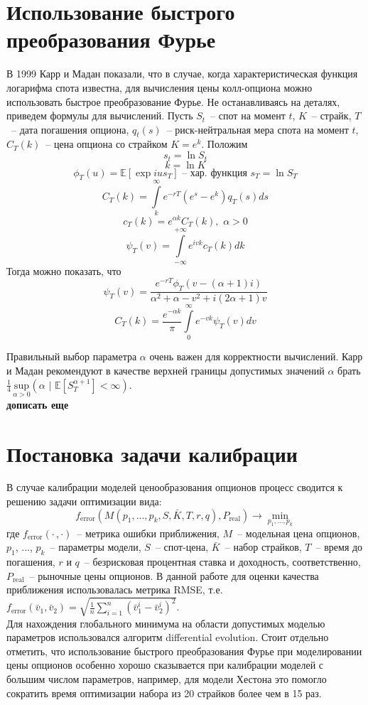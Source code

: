 \documentclass[oneside, final, 12pt]{article}
\begin{document}
\section{Использование быстрого преобразования Фурье}
В 1999 Карр и Мадан показали, что в случае, когда характеристическая функция логарифма спота известна, для вычисления цены колл-опциона можно использовать быстрое преобразование Фурье. Не останавливаясь на деталях, приведем формулы для вычислений. Пусть $S_t$~-- спот на момент $t$, $K$~-- страйк, $T$~-- дата погашения опциона, $q_t(s)$~-- риск-нейтральная мера спота на момент $t$, $C_T(k)$~-- цена опциона со страйком $K = e^k$. Положим
\[ s_t = \ln{S_t} \]
\[ k = \ln{K} \]
\[ \phi_T(u) = \mathbb{E}\left[ \exp{ius_T} \right] \text{~-- хар. функция } s_T=\ln{S_T}\]
\[ C_T(k) = \int\limits_k^\infty e^{-rT}(e^s - e^k)q_T(s)ds \]
\[ c_T(k) = e^{\alpha k}C_T(k),\,\, \alpha > 0 \]
\[ \psi_T(v) = \int\limits_{-\infty}^{+\infty} e^{ivk} c_T(k) dk\]
Тогда можно показать, что 
\[ \psi_T(v) = \frac{e^{-rT}\phi_T(v - (\alpha + 1)i)}{\alpha^2 + \alpha - v^2 + i(2\alpha + 1)v} \]
\[ C_T(k) = \frac{e^{-\alpha k}}{\pi} \int\limits_0^\infty e^{-vk} \psi_T(v) dv \]

Правильный выбор параметра $\alpha$ очень важен для корректности вычислений. Карр и Мадан рекомендуют в качестве верхней границы допустимых значений $\alpha$ брать 
\( \frac{1}{4} \, \underset{\alpha > 0}{\mathrm{sup}}(\alpha \,\, | \,\, \mathbb{E}[S_T^{\alpha+1}] < \infty) \). \\
\textbf{дописать еще}


\newpage
\section{Постановка задачи калибрации}
В случае калибрации моделей ценообразования опционов процесс сводится к решению задачи оптимизации вида:
\[
f_\text{error}(M(p_1, ..., p_k, S, \bar K, T, r, q), P_\text{real}) \rightarrow \underset{p_1, ..., p_k}{\min}
\]
где $f_\text{error}(\cdot \, , \cdot)$~-- метрика ошибки приближения, $M$~-- модельная цена опционов,\\ $p_1$, ..., $p_k$~-- параметры модели, $S$~-- спот-цена, $\bar K$~-- набор страйков, $T$~-- время до погашения, $r$ и $q$~-- безрисковая процентная ставка и доходность, соответственно, $P_\text{real}$~-- рыночные цены опционов. В данной работе для оценки качества приближения использовалась метрика RMSE, т.е. \( f_\text{error}(\bar v_1, \bar v_2) = \sqrt{ \frac{1}{n} \sum\limits_{i = 1}^n{(\bar v_1^i - \bar v_2^i)^2} } \). 
\\
Для нахождения глобального минимума на области допустимых моделью параметров использовался алгоритм differential evolution\cite{DE:paper1}\cite{DE:paper2}. Стоит отдельно отметить, что использование быстрого преобразования Фурье\cite{FFT:paper} при моделировании цены опционов особенно хорошо сказывается при калибрации моделей с большим числом параметров, например, для модели Хестона это помогло сократить время оптимизации набора из 20 страйков более чем в 15 раз.
\end{document}
